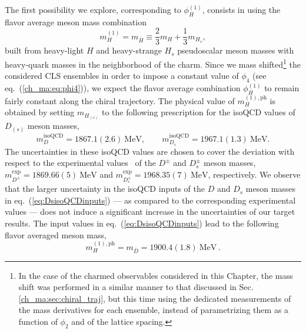 The first possibility we explore, corresponding to $\phi_H^{(1)}$, consists in using the flavor average meson mass combination
\begin{equation}
        m_H^{(1)} = m_{\overline{H}} \equiv \frac{2}{3} m_H + \frac{1}{3}m_{H_s},
        \label{eq:fl_av_matching}
\end{equation}
built from heavy-light $H$ and heavy-strange $H_s$ pseudoscalar meson masses with heavy-quark masses in the neighborhood of the charm.
%
Since we mass shifted\footnote{In the case of the charmed observables considered in this Chapter, the mass shift was performed in a similar manner to that discussed in Sec. \ref{ch_ma:sec:chiral_traj}, but this time using the dedicated measurements of the mass derivatives for each ensemble, instead of parametrizing them as a function of $\phi_2$ and of the lattice spacing.} the considered CLS ensembles in order to impose a constant value of $\phi_4$ (see eq.~(\ref{ch_ma:eq:phi4})), we expect the flavor average combination $\phi_H^{(1)}$ to remain fairly constant along the chiral trajectory. The physical value of $m_H^{(1), \mathrm{ph}}$ is obtained by setting $m_{H_{(s)}}$ to the following prescription for the isoQCD values of $D_{(s)}$ meson masses,
%
\begin{equation}
    m_D^{\mathrm{isoQCD}} = 1867.1(2.6)  \ \mathrm{MeV}, \qquad m_{D_s}^{\mathrm{isoQCD}} = 1967.1(1.3) \ \mathrm{MeV}.
\label{eq:DsisoQCDinputs}
\end{equation}
%
The uncertainties in these isoQCD values are chosen to cover the deviation with respect to the experimental values~\cite{ParticleDataGroup:2022pth} of the $D^{\pm}$ and $D_s^{\pm}$ meson masses, $m_{D^\pm}^{\mathrm{exp}} = 1869.66(5) \ \mathrm{MeV}$ and $m_{D_s^\pm}^{\mathrm{exp}} = 1968.35(7) \ \mathrm{MeV}$, respectively. We observe that the larger uncertainty in the isoQCD inputs of the $D$ and $D_s$ meson masses in eq.~(\ref{eq:DsisoQCDinputs}) --- as compared to the corresponding experimental values --- does not induce a significant increase in the uncertainties of our target results. The input values in eq.~(\ref{eq:DsisoQCDinputs}) lead to the following flavor averaged meson mass,
%
\begin{equation}
         m_H^{(1), \mathrm{ph}} = m_{\overline{D}} = 1900.4(1.8) \ \mathrm{MeV}\,.
\end{equation}
% 


